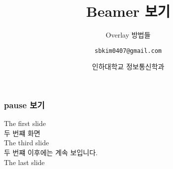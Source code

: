 \documentclass{beamer}
\title{Beamer 보기}
\subtitle{Overlay 방법들}
\author[Cheng-Bin Jin]{\texttt{sbkim0407@gmail.com}}
\date[\today]{인하대학교 정보통신학과}
\institute{컴퓨터비젼 연구실}
\begin{document}
\begin{frame}
\titlepage
\end{frame}

\begin{frame}
\frametitle{pause 보기}
The first slide \\
\pause
두 번쨰 화면 \\
\pause
The third slide \\
\pause[2]
두 번쨰 이후에는 계속 보입니다. \\
\pause
The last slide \\
\end{frame}
\end{document}
